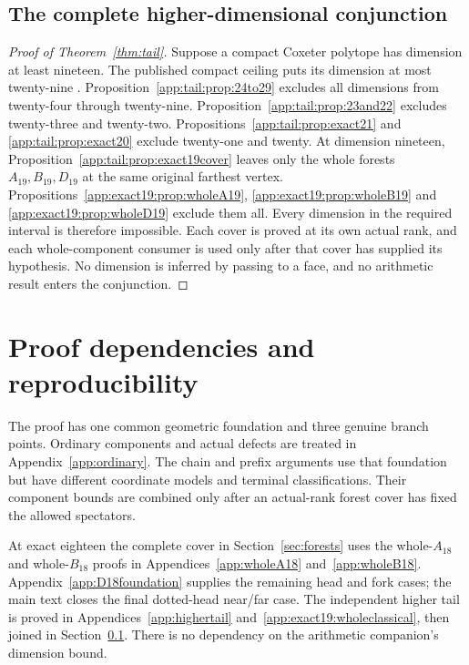 \documentclass[11pt]{article}
\theoremstyle{definition}
\theoremstyle{remark}
\begin{document}
\subsection{The complete higher-dimensional conjunction}
\label{app:tail:completeconjunction}
\begin{proof}[Proof of Theorem~\ref{thm:tail}]
Suppose a compact Coxeter polytope has dimension at least nineteen.
The published compact ceiling puts its dimension at most twenty-nine
\cite{Vin84,Vin85}. Proposition~\ref{app:tail:prop:24to29} excludes
all dimensions from twenty-four through twenty-nine.
Proposition~\ref{app:tail:prop:23and22} excludes twenty-three and
twenty-two. Propositions~\ref{app:tail:prop:exact21} and
\ref{app:tail:prop:exact20} exclude twenty-one and twenty.
At dimension nineteen, Proposition~\ref{app:tail:prop:exact19cover}
leaves only the whole forests $A_{19},B_{19},D_{19}$ at the same
original farthest vertex. Propositions~\ref{app:exact19:prop:wholeA19},
\ref{app:exact19:prop:wholeB19} and
\ref{app:exact19:prop:wholeD19} exclude them all.
Every dimension in the required interval is therefore impossible.
Each cover is proved at its own actual rank, and each whole-component
consumer is used only after that cover has supplied its hypothesis.
No dimension is inferred by passing to a face, and no arithmetic
result enters the conjunction.
\end{proof}

\section{Proof dependencies and reproducibility}
\label{app:obligations}
The proof has one common geometric foundation and three genuine
branch points. Ordinary components and actual defects are treated
in Appendix~\ref{app:ordinary}. The chain and prefix arguments use
that foundation but have different coordinate models and terminal
classifications. Their component bounds are combined only after
an actual-rank forest cover has fixed the allowed spectators.

At exact eighteen the complete cover in Section~\ref{sec:forests}
uses the whole-\(A_{18}\) and whole-\(B_{18}\) proofs in
Appendices~\ref{app:wholeA18} and~\ref{app:wholeB18}.
Appendix~\ref{app:D18foundation} supplies the remaining head and
fork cases; the main text closes the final dotted-head near/far case.
The independent higher tail is proved in
Appendices~\ref{app:highertail} and~\ref{app:exact19:wholeclassical},
then joined in Section~\ref{app:tail:completeconjunction}.
There is no dependency on the arithmetic companion's dimension bound.
\end{document}
